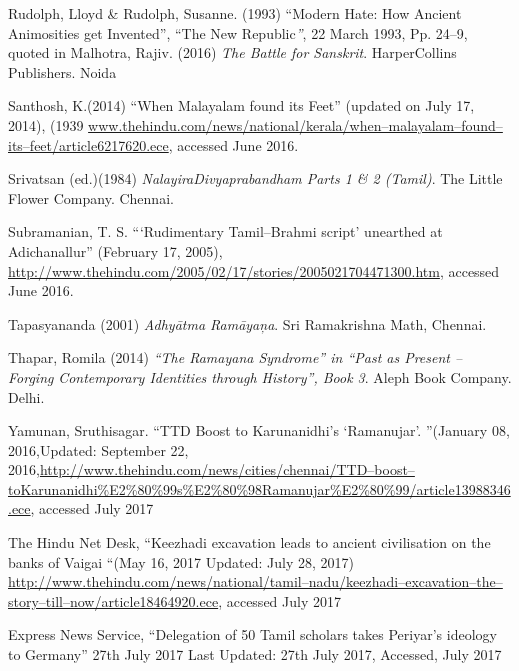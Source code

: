 \begin{thebibliography}{99}
  Rudolph, Lloyd \& Rudolph, Susanne. (1993) “Modern Hate: How Ancient Animosities get Invented”, “The New Republic\textit{”}, 22 March 1993, Pp. 24–9, quoted in Malhotra, Rajiv. (2016) \textit{The Battle for Sanskrit}. HarperCollins Publishers. Noida

  Santhosh, K.(2014) “When Malayalam found its Feet” (updated on July 17, 2014), (1939 \url{www.thehindu.com/news/national/kerala/when–malayalam–found–its–feet/article6217620.ece}, accessed June 2016.

  Srivatsan (ed.)(1984) \textit{NalayiraDivyaprabandham Parts 1 \& 2 (Tamil)}. The Little Flower Company. Chennai.

  Subramanian, T. S. “‘Rudimentary Tamil–Brahmi script' unearthed at Adichanallur” (February 17, 2005), \url{http://www.thehindu.com/2005/02/17/stories/2005021704471300.htm}, accessed June 2016.

  Tapasyananda (2001) \textit{Adhyātma Ramāyaņa}. Sri Ramakrishna Math, Chennai.

  Thapar, Romila (2014) \textit{“The Ramayana Syndrome” in “Past as Present – Forging} \textit{Contemporary Identities through History”, Book 3}. Aleph Book Company. Delhi.

  Yamunan, Sruthisagar. “TTD Boost to Karunanidhi’s ‘Ramanujar’. ”(January 08, 2016,Updated: September 22, 2016,\url{http://www.thehindu.com/news/cities/chennai/TTD–boost–toKarunanidhi%E2%80%99s%E2%80%98Ramanujar%E2%80%99/article13988346.ece}, accessed July 2017

  The Hindu Net Desk, “Keezhadi excavation leads to ancient civilisation on the banks of Vaigai “(May 16, 2017 Updated: July 28, 2017) \url{http://www.thehindu.com/news/national/tamil–nadu/keezhadi–excavation–the–story–till–now/article18464920.ece}, accessed July 2017

  Express News Service, “Delegation of 50 Tamil scholars takes Periyar’s ideology to Germany” 27th July 2017 Last Updated: 27th July 2017, Accessed, July 2017

 \end{thebibliography}


